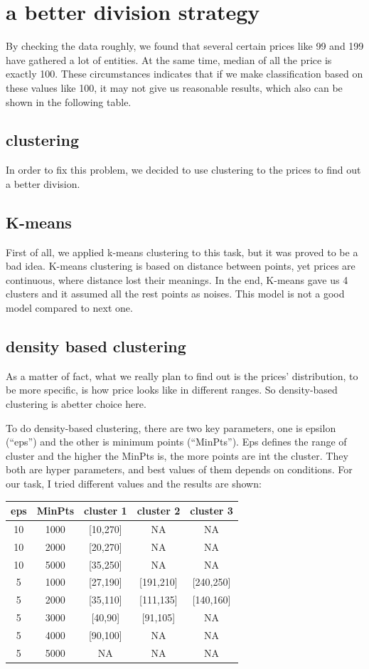 \documentclass{sig-alternate}
\begin{document}
	\section{a better division strategy}
	By checking the data roughly, we found that several certain prices like 99 and 199 have gathered
	a lot of entities. At the same time, median of all the price is exactly 100. These circumstances
	indicates that if we make classification based on these values like 100, it may not give us reasonable results, which
	also can be shown in the following table.

	\subsection{clustering}
	In order to fix this problem, we decided to use clustering to the prices to find out a better division. 
	\subsection{K-means}
	First of all, we applied k-means clustering to this task, but it was proved to be a bad idea.
	K-means clustering is based on distance between points, yet prices are continuous, where distance 
	lost their meanings. In the end, K-means gave us 4 clusters 
	and it assumed all the rest points as noises. This model is not a good model compared to next one.

	\subsection{density based clustering}

	As a matter of fact, what we really plan to find out is the prices' distribution, to be more specific, is
	how price looks like in different ranges. So density-based clustering 
	is abetter choice here.

	To do density-based clustering, there are two key parameters, one is epsilon (“eps”) and the other is minimum points (“MinPts”). 
	Eps defines the range of cluster and the higher the MinPts is, the more points are int the cluster. They both are hyper parameters,
	and best values of them depends on conditions. For our task, I tried different values and the results are shown:
	

		\begin{tabular}{c|c|c|c|c}
		\hline
		eps& MinPts& cluster 1&cluster 2&cluster 3 \\
		\hline
		10& 1000& [10,270]&NA&NA\\
		10& 2000&[20,270] &NA&NA\\
		10& 5000&[35,250]&NA&NA\\
		5& 1000&[27,190]&[191,210]&[240,250]\\
		5& 2000&[35,110]&[111,135]&[140,160]\\
		5& 3000&[40,90]&[91,105]&NA\\
		5& 4000&[90,100]&NA&NA\\
		5& 5000&NA&NA&NA\\
		\hline
	\end{tabular}
\end{document}
